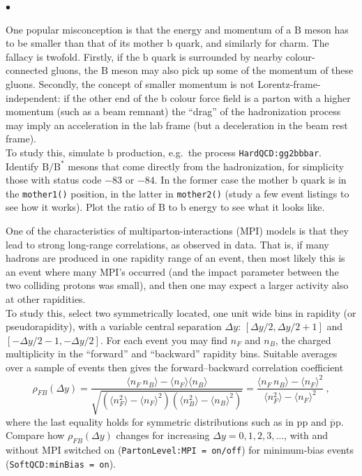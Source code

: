 \documentclass[12pt,a4paper]{article}
\renewcommand{\b}{{\mathrm b}}
\newcommand{\p}{{\mathrm p}}
\newcommand{\B}{{\mathrm B}}
\newcommand{\pbar}{\overline{\mathrm p}}
\newenvironment{Itemize}{\begin{list}{$\bullet$}%
{\setlength{\topsep}{0.4mm}\setlength{\partopsep}{0.4mm}%
\setlength{\itemsep}{0.4mm}\setlength{\parsep}{0.4mm}}}%
{\end{list}}
\begin{document}
\begin{Itemize}
\item One popular misconception is that the energy and momentum of a 
$\B$ meson has to be smaller than that of its mother $\b$ quark, and 
similarly for charm. The fallacy is twofold. Firstly, if the $\b$ 
quark is surrounded by nearby colour-connected gluons, the $\B$ meson 
may also pick up some of the momentum of these gluons. Secondly, the
concept of smaller momentum is not Lorentz-frame-independent:
if the other end of the $\b$ colour force field is a parton with a
higher momentum (such as a beam remnant) the ``drag'' of the 
hadronization process may imply an acceleration in the lab frame
(but a deceleration in the beam rest frame).\\
To study this, simulate $\b$ production, e.g.\ the process
\texttt{HardQCD:gg2bbbar}. Identify $\B / \B^*$ mesons that
come directly from the hadronization, for simplicity those with
status code $-83$ or $-84$. In the former case the mother $\b$
quark is in the \texttt{mother1()} position, in the latter in
\texttt{mother2()} (study a few event listings to see how it works).
Plot the ratio of $\B$ to $\b$ energy to see what it looks like.       

\item One of the characteristics of multiparton-interactions (MPI) models
is that they lead to strong long-range correlations, as observed in
data. That is, if many hadrons are produced in one rapidity range
of an event, then most likely this is an event where many MPI's
occurred (and the impact parameter between the two colliding protons
was small), and then one may expect a larger activity also at other
rapidities.\\
To study this, select two symmetrically located, one unit wide bins 
in rapidity (or pseudorapidity), with a variable central separation 
$\Delta y$: $\left[ \Delta y/2, \Delta y/2 + 1 \right]$ and 
$\left[ - \Delta y/2 - 1, - \Delta y/2 \right]$.
For each event you may find $n_F$ and $n_B$, the charged multiplicity 
in the ``forward'' and ``backward'' rapidity bins. Suitable averages 
over a sample of events then gives the forward--backward correlation 
coefficient
\[
\rho_{FB}(\Delta y) = \frac{\langle n_F \, n_B \rangle 
- \langle n_F \rangle \langle n_B \rangle}%
{\sqrt{(\langle n_F^2 \rangle - \langle n_F \rangle^2)
(\langle n_B^2 \rangle - \langle n_B \rangle^2)}} 
= \frac{\langle n_F \, n_B \rangle - \langle n_F \rangle^2}%
{\langle n_F^2 \rangle - \langle n_F \rangle^2} ~,
\]
where the last equality holds for symmetric distributions such as
in $\p\p$ and $\pbar\p$.\\
Compare how $\rho_{FB}(\Delta y)$ changes for increasing
$\Delta y = 0, 1, 2, 3, \ldots$, with and without MPI switched on
(\texttt{PartonLevel:MPI = on/off}) for minimum-bias events
(\texttt{SoftQCD:minBias = on}).


\end{Itemize}
\end{document}
